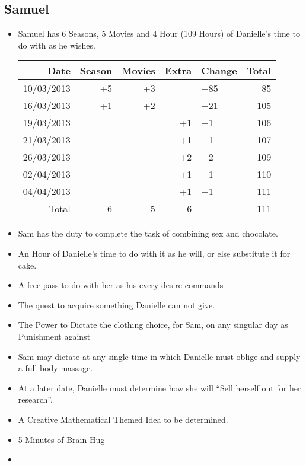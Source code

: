    \subsection{Samuel}
   \begin{itemize}
     \item Samuel has 6 Seasons, 5 Movies and 4 Hour (109 Hours) of Danielle's time to do with as he wishes.\\
     \begin{tabular}{r|rrr|l||r}
 		Date&Season&Movies&Extra&Change&Total\\
 		\hline
 		10/03/2013&+5&+3	&		&+85	&85 \\
 		16/03/2013&+1&+2	&		&+21	&105\\
 		19/03/2013&	 &		&+1		&+1		&106\\
 		21/03/2013&	 &		&+1		&+1		&107\\
 		26/03/2013&	 &		&+2		&+2		&109\\
 		02/04/2013&	 &		&+1 	&+1		&110\\
 		04/04/2013&	 &		&+1		&+1		&111\\
 		\hline
 		\hline
 		Total&6&5&6&&111
 	\end{tabular}
     \item Sam has the duty to complete the task of combining sex and chocolate.
     \item An Hour of Danielle's time to do with it as he will, or else substitute it for cake.
     \item A free pass to do with her as his every desire commands
     \item The quest to acquire something Danielle can not give.
     \item The Power to Dictate the clothing choice, for Sam, on any singular day as Punishment against
     \item Sam may dictate at any single time in which Danielle must oblige and supply a full body massage.
     \item At a later date, Danielle must determine how she will ``Sell herself out for her research''.
     \item A Creative Mathematical Themed Idea to be determined.
     \item 5 Minutes of Brain Hug
     \item 
   \end{itemize}
    